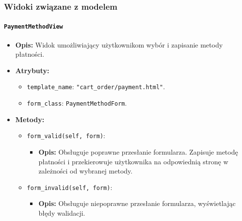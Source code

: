 \documentclass[12pt,a4paper,oneside]{article}
\theoremstyle{definition}
\numberwithin{equation}{section}
\begin{document}
\subsubsection*{Widoki związane z modelem}

\paragraph{\texttt{PaymentMethodView}}
\begin{itemize}
    \item \textbf{Opis:} Widok umożliwiający użytkownikom wybór i zapisanie metody płatności.
    \item \textbf{Atrybuty:}
    \begin{itemize}
        \item \texttt{template\_name}: \texttt{"cart\_order/payment.html"}.
        \item \texttt{form\_class}: \texttt{PaymentMethodForm}.
    \end{itemize}
    \item \textbf{Metody:}
    \begin{itemize}
        \item \texttt{form\_valid(self, form)}:
        \begin{itemize}
            \item \textbf{Opis:} Obsługuje poprawne przesłanie formularza. Zapisuje metodę płatności i przekierowuje użytkownika na odpowiednią stronę w zależności od wybranej metody.
        \end{itemize}
        \item \texttt{form\_invalid(self, form)}:
        \begin{itemize}
            \item \textbf{Opis:} Obsługuje niepoprawne przesłanie formularza, wyświetlając błędy walidacji.
        \end{itemize}
    \end{itemize}
\end{itemize}
\end{document}
